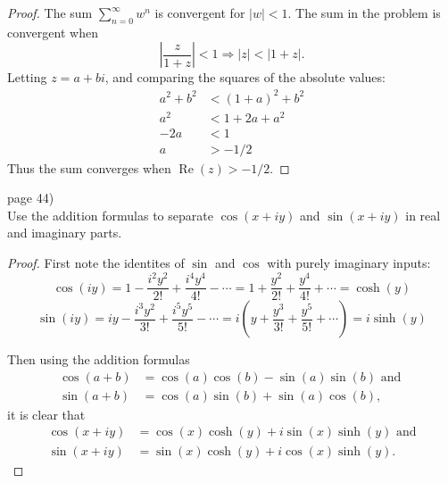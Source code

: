 \documentclass{article}
\newenvironment{problem}[2][Problem]{\begin{trivlist}
\item[\hskip \labelsep {\bfseries #1}\hskip \labelsep {\bfseries #2.}]}{\end{trivlist}}
\begin{document}
\begin{proof}
  The sum $\sum_{n = 0}^\infty w^n$ is convergent for $|w| < 1$.
  The sum in the problem is convergent when \[
    \left|\frac{z}{1 + z}\right| < 1 \Longrightarrow |z| < |1 + z|.
  \]
  Letting $z = a + bi$, and comparing the squares of the absolute values: \begin{align*}
    a^2 + b^2 &< (1 + a)^2 + b^2 \\
    a^2 &< 1 + 2a + a^2 \\
    -2a &< 1 \\
    a &> -1/2
  \end{align*}
  Thus the sum converges when $\operatorname{Re}(z) > -1/2$.
\end{proof}

\pagebreak

\begin{problem}{3} (page 44) \\
  Use the addition formulas to separate
    $\cos(x + iy)$ and $\sin(x + iy)$
    in real and imaginary parts.
\end{problem}

\begin{proof}
  First note the identites of $\sin$ and $\cos$ with purely imaginary inputs: \[
    \cos(iy) = 1 - \frac{i^2y^2}{2!} + \frac{i^4y^4}{4!} - \cdots
      = 1 + \frac{y^2}{2!} + \frac{y^4}{4!} + \cdots
      = \cosh(y)
  \]\[
    \sin(iy) = iy - \frac{i^3y^2}{3!} + \frac{i^5y^5}{5!} - \cdots
      = i(y + \frac{y^3}{3!} + \frac{y^5}{5!} + \cdots)
      = i\sinh(y)
  \]

  Then using the addition formulas
  \begin{align*}
    \cos(a + b) &= \cos(a)\cos(b) - \sin(a)\sin(b) \text{ and }\\
    \sin(a + b) &= \cos(a)\sin(b) + \sin(a)\cos(b),
  \end{align*}
  it is clear that \begin{align*}
    \cos(x + iy) &= \cos(x)\cosh(y) + i\sin(x)\sinh(y) \text { and} \\
    \sin(x + iy) &= \sin(x)\cosh(y) + i\cos(x)\sinh(y).
\end{align*}

\end{proof}

\pagebreak
\end{document}
